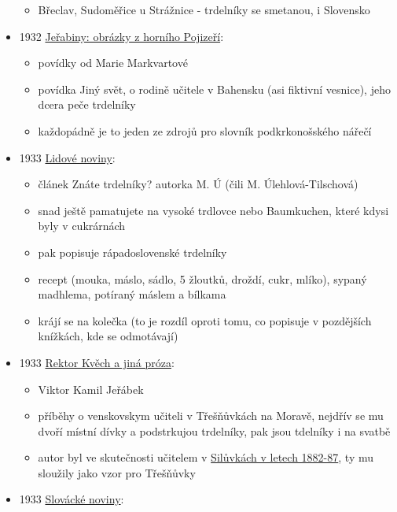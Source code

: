 \begin{itemize}
  \begin{itemize}
  \tightlist
  \item
    Břeclav, Sudoměřice u Strážnice - trdelníky se smetanou, i Slovensko
  \end{itemize}
\item
  1932
  \href{https://www.digitalniknihovna.cz/mzk/view/uuid:ea5d2d20-0652-11e8-b1a1-005056827e52?page=uuid\%3A58510a10-3f36-11e8-a7aa-005056825209&fulltext=trdeln\%C3\%ADk}{Jeřabiny:
  obrázky z horního Pojizeří}:

  \begin{itemize}
  \tightlist
  \item
    povídky od Marie Markvartové
  \item
    povídka Jiný svět, o rodině učitele v Bahensku (asi fiktivní
    vesnice), jeho dcera peče trdelníky
  \item
    každopádně je to jeden ze zdrojů pro slovník podkrkonošského nářečí
  \end{itemize}
\item
  1933
  \href{https://ceskadigitalniknihovna.cz/view/uuid:1026bc40-ea8b-11dc-9dcb-000d606f5dc6?page=uuid\%3Ac347cf40-31ff-4912-b767-a8cb9e4e8683&fulltext=trdeln*&source=nkp}{Lidové
  noviny}:

  \begin{itemize}
  \tightlist
  \item
    článek Znáte trdelníky? autorka M. Ú (čili M. Úlehlová-Tilschová)
  \item
    snad ještě pamatujete na vysoké trdlovce nebo Baumkuchen, které
    kdysi byly v cukrárnách
  \item
    pak popisuje rápadoslovenské trdelníky
  \item
    recept (mouka, máslo, sádlo, 5 žloutků, droždí, cukr, mlíko), sypaný
    madhlema, potíraný máslem a bílkama
  \item
    krájí se na kolečka (to je rozdíl oproti tomu, co popisuje v
    pozdějších knížkách, kde se odmotávají)
  \end{itemize}
\item
  1933
  \href{https://ceskadigitalniknihovna.cz/view/uuid:60eab9a0-0be7-11ed-8635-005056827e52?page=uuid\%3A8ee6bb86-db3e-4211-a60a-d927a201dc69&fulltext=trdeln*&source=mzk}{Rektor
  Kvěch a jiná próza}:

  \begin{itemize}
  \tightlist
  \item
    Viktor Kamil Jeřábek
  \item
    příběhy o venskovskym učiteli v Třešňůvkách na Moravě, nejdřív se mu
    dvoří místní dívky a podstrkujou trdelníky, pak jsou tdelníky i na
    svatbě
  \item
    autor byl ve skutečnosti učitelem v
    \href{https://kramerius.lib.cas.cz/view/uuid:48220bc0-4294-11e2-b246-005056827e52?page=uuid\%3A04efbdca-01ec-4111-8df2-32a5f52f4c16}{Silůvkách
    v letech 1882-87}, ty mu sloužily jako vzor pro Třešňůvky
  \end{itemize}
\item
  1933
  \href{https://www.digitalniknihovna.cz/vkol/uuid/uuid:349c38c2-fadc-4992-a172-9aacc818e434}{Slovácké
  noviny}:


\end{itemize}

